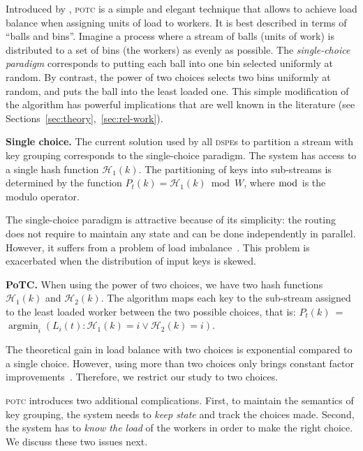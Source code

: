 \documentclass[10pt,conference,letterpaper]{IEEEtran}
\newcommand{\spara}[1]{\smallskip\noindent\textbf{#1}}
\newcommand{\hash}[1]{\ensuremath{\mathcal{H}_{#1}}\xspace}
\newcommand{\potc}{\textsc{p\textup{o}tc}\xspace}
\newcommand{\dspe}{\textsc{dspe}\xspace}
\newcommand{\dspes}{{\dspe}s\xspace}
\DeclareMathOperator*{\argmin}{argmin}
\begin{document}
Introduced by \citet{azar1999balanced-allocations}, \potc is a simple and elegant technique that allows to achieve load balance when assigning units of load to workers.
It is best described in terms of ``balls and bins''.
Imagine a process where a stream of balls (units of work) is distributed to a set of bins (the workers) as evenly as possible.
The \emph{single-choice paradigm} corresponds to putting each ball into one bin selected uniformly at random.
By contrast, the power of two choices selects two bins uniformly at random, and puts the ball into the least loaded one.
This simple modification of the algorithm has powerful implications that are well known in the literature (see Sections~\ref{sec:theory},~\ref{sec:rel-work}). 









\spara{Single choice.}
The current solution used by all \dspes to partition a stream with key grouping corresponds to the single-choice paradigm.
The system has access to a single hash function $\hash{1}(k)$.
The partitioning of keys into sub-streams is determined by the function $ P_{t}(k) = \hash{1}(k) \bmod W $,
where $\bmod$ is the modulo operator.

The single-choice paradigm is attractive because of its simplicity: the routing does not require to maintain any state and can be done independently in parallel.
However, it suffers from a problem of load imbalance~\citep{mitzenmacher2001power}.
This problem is exacerbated when the distribution of input keys is skewed.


\spara{PoTC.}
When using the power of two choices, we have two hash functions $\hash{1}(k)$ and $\hash{2}(k)$.
The algorithm maps each key to the sub-stream assigned to the least loaded worker between the two possible choices, that is:
$P_{t}(k)$~=~$\argmin_i(L_i(t) : \hash{1}(k) = i \lor \hash{2}(k) = i)$.


The theoretical gain in load balance with two choices is exponential compared to a single choice.
However, using more than two choices only brings constant factor improvements~\citep{azar1999balanced-allocations}.
Therefore, we restrict our study to two choices.

\potc introduces two additional complications.
First, to maintain the semantics of key grouping, the system needs to \emph{keep state} and track the choices made.
Second, the system has to \emph{know the load} of the workers in order to make the right choice.
We discuss these two issues next.
\end{document}
